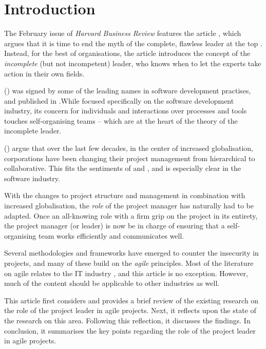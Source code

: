\section{Introduction}

The February \citeyear{hbr:incompleteleader} issue of \emph{Harvard Business Review} features the article , which argues that it is time to end the myth of the complete, flawless leader at the top \autocite{hbr:incompleteleader}. Instead, for the best of organisations, the article introduces the concept of the \emph{incomplete} (but not incompetent) leader, who knows when to let the experts take action in their own fields.

 (\citeauthor{agilemanifesto}) was signed by some of the leading names in software development practises, and published in \citeyear{agilemanifesto}.While focused specifically on the software development industry, its concern for individuals and interactions over processes and tools touches self-organising teams – which are at the heart of the theory of the incomplete leader.

\citeauthor{fernandez:agilevstraditional} (\citeyear{fernandez:agilevstraditional}) argue that over the last few decades, in the center of increased globalisation, corporations have been changing their project management from hierarchical to collaborative. This fits the sentiments of  and , and is especially clear in the software industry.

With the changes to project structure and management in combination with increased globalisation, the \emph{role} of the project manager has naturally had to be adapted. Once an all-knowing role with a firm grip on the project in its entirety, the project manager (or leader) is now be in charge of ensuring that a self-organising team works efficiently and communicates well.

Several methodologies and frameworks have emerged to counter the insecurity in projects, and many of these build on the \emph{agile} principles. Most of the literature on agile relates to the IT industry \autocite{fernandez:agilevstraditional}, and this article is no exception. However, much of the content should be applicable to other industries as well.

This article first considers and provides a brief review of the existing research on the role of the project leader in agile projects. Next, it reflects upon the state of the research on this area. Following this reflection, it discusses the findings. In conclusion, it summarises the key points regarding the role of the project leader in agile projects.
